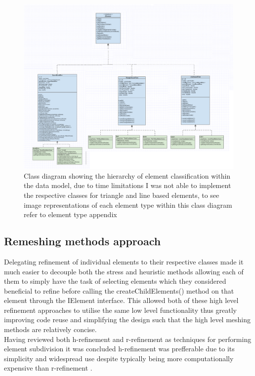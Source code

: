 \begin{figure}[h!!]                                                   
  \centerline{\includegraphics[width=150mm, scale=1]{../Graphics/ElementHigerarchyDiagram2.png}}
  \caption{Class diagram showing the hierarchy of element classification within the data model, due to time limitations I was not able to implement the respective classes for triangle and line based elements, to see image representations of each element type within this class diagram refer to element type appendix}
  \label{fig:h-refinementImp}
\end{figure}


\subsection{Remeshing methods approach}

Delegating refinement of individual elements to their respective classes made it much easier to decouple both the stress and heuristic methods allowing each of them to simply have the task of selecting elements which they considered beneficial to refine before calling the createChildElements() method on that element through the IElement interface. This allowed both of these high level refinement approaches to utilise the same low level functionality thus greatly improving code reuse and simplifying the design such that the high level meshing methods are relatively concise. \\

\noindent
Having reviewed both h-refinement \cite{HandPRefinements} and r-refinement \cite{RRefinement} as techniques for performing element subdivision it was concluded h-refinement was prefferable due to its simplicity and widespread use despite typically being more computationally expensive than r-refinement \cite{HandPRefinements} \cite{RRefinement}. \\ \\ \\ \\ \\

